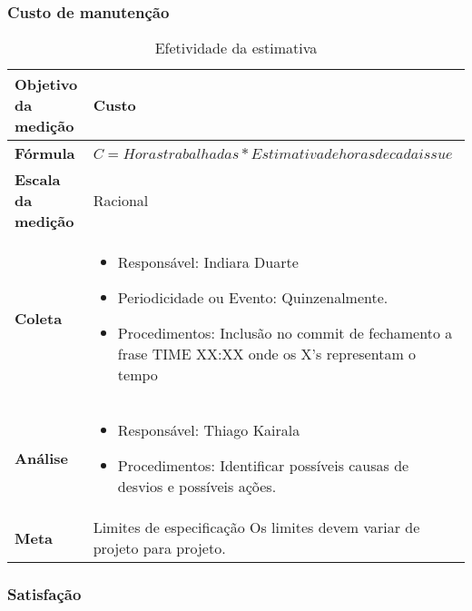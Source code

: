 \subsubsection{Custo de manutenção}


\begin{table}[H]
\centering
\begin{tabular}{|p{4cm}|p{7cm}|}
\hline
	\textbf{Objetivo da medição} &
	Custo
	\\ \hline
	\textbf{Fórmula} &
	$C = Horas trabalhadas * Estimativa de horas de cada issue$
	\\ \hline
	\textbf{Escala da medição} &
	Racional
	\\ \hline
	\textbf{Coleta} &
	\begin{itemize}
		\item{Responsável: Indiara Duarte}
		\item{Periodicidade ou Evento: Quinzenalmente.}
		\item{Procedimentos:  Inclusão no commit de fechamento a frase TIME XX:XX onde os X's representam o tempo}
	\end{itemize}
	\\ \hline
	\textbf{Análise} &
	\begin{itemize}
		\item Responsável: Thiago Kairala
		\item Procedimentos: Identificar possíveis causas de desvios e possíveis ações.
	\end{itemize}
	\\ \hline
	\textbf{Meta} &
	Limites de especificação
		Os limites devem variar de projeto para projeto.
  \\ \hline
\end{tabular}
\caption{Efetividade da estimativa}
\label{tab:efetividade_estimativa}
\end{table}

\subsubsection{Satisfação}


